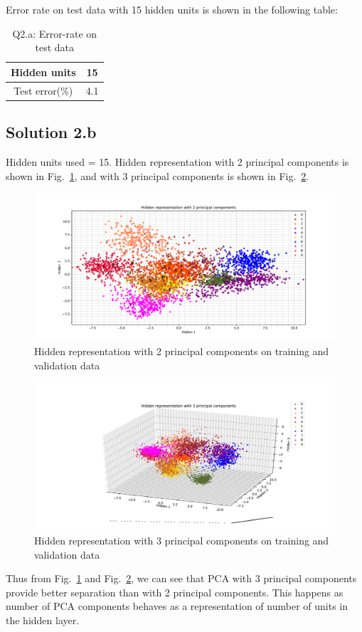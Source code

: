 Error rate on test data with 15 hidden units is shown in the following table:
\begin{table}[h!]
	\begin{center}
		\begin{tabular}{||c | c ||} 
			\hline
			Hidden units & 15 \\ [0.5ex] 
			\hline\hline
			Test error(\%) & 4.1\\ [1ex]
			\hline
		\end{tabular}
	\end{center}
	\caption{Q2.a: Error-rate on test data}
\end{table}
\subsection*{Solution 2.b}
Hidden units used = 15. Hidden representation with 2 principal components is shown in Fig.~\ref{fig:pca2_2b}, and with 3 principal components is shown in Fig.~\ref{fig:pca3_2b}.
\begin{figure}[h!]
	\centering
	\includegraphics[scale=0.5]{2b_pca2.pdf}
	\caption{Hidden representation with 2 principal components on training and validation data}
	\label{fig:pca2_2b}
\end{figure}
\begin{figure}[h!]
	\centering
	\includegraphics[scale=0.5]{2b_pca3.pdf}
	\caption{Hidden representation with 3 principal components on training and validation data}
	\label{fig:pca3_2b}
\end{figure}
Thus from Fig.~\ref{fig:pca2_2b} and Fig.~\ref{fig:pca3_2b}, we can see that PCA with 3 principal components provide better separation than with 2 principal components. This happens as number of PCA components behaves as a representation of number of units in the hidden layer.